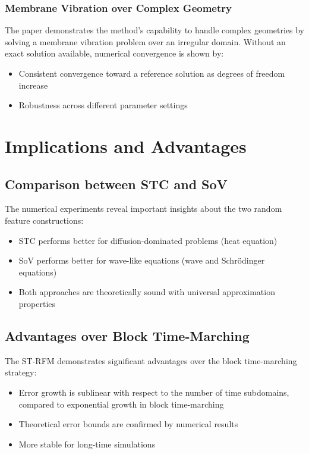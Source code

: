 \documentclass[11pt]{article}
\begin{document}
\subsubsection{Membrane Vibration over Complex Geometry}

The paper demonstrates the method's capability to handle complex geometries by solving a membrane vibration problem over an irregular domain. Without an exact solution available, numerical convergence is shown by:
\begin{itemize}
    \item Consistent convergence toward a reference solution as degrees of freedom increase
    \item Robustness across different parameter settings
\end{itemize}

\section{Implications and Advantages}

\subsection{Comparison between STC and SoV}

The numerical experiments reveal important insights about the two random feature constructions:
\begin{itemize}
    \item STC performs better for diffusion-dominated problems (heat equation)
    \item SoV performs better for wave-like equations (wave and Schrödinger equations)
    \item Both approaches are theoretically sound with universal approximation properties
\end{itemize}

\subsection{Advantages over Block Time-Marching}

The ST-RFM demonstrates significant advantages over the block time-marching strategy:
\begin{itemize}
    \item Error growth is sublinear with respect to the number of time subdomains, compared to exponential growth in block time-marching
    \item Theoretical error bounds are confirmed by numerical results
    \item More stable for long-time simulations
\end{itemize}
\end{document}

